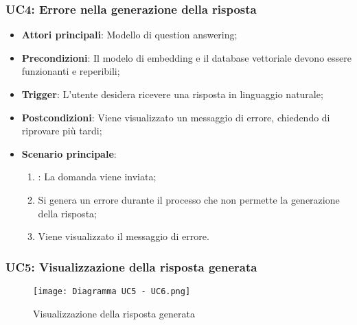 \hypertarget{UC4}{}
\subsubsection{UC4: Errore nella generazione della risposta}

\begin{itemize}
    \item \textbf{Attori principali}: Modello di question answering;
    \item \textbf{Precondizioni}: Il modelo di embedding e il database vettoriale devono essere funzionanti e reperibili;
    \item \textbf{Trigger}: L'utente desidera ricevere una risposta in linguaggio naturale;
    \item \textbf{Postcondizioni}: Viene visualizzato un messaggio di errore, chiedendo di riprovare più tardi;
    \item \textbf{Scenario principale}:
    \begin{enumerate}
        \item {}: La domanda viene inviata;
        \item Si genera un errore durante il processo che non permette la generazione della risposta;
        \item Viene visualizzato il messaggio di errore.
    \end{enumerate}
\end{itemize}


\hypertarget{UC5}{}
\subsubsection{UC5: Visualizzazione della risposta generata}

\begin{figure}[h]
    \centering
    \texttt{[image: Diagramma UC5 - UC6.png]}
    \caption{Visualizzazione della risposta generata}
\end{figure}

